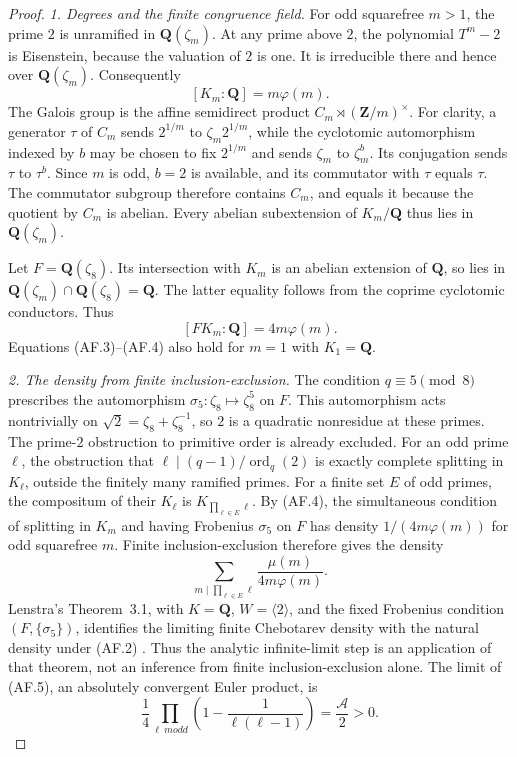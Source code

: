 \begin{proof}
\emph{1. Degrees and the finite congruence field.}
For odd squarefree $m>1$, the prime $2$ is unramified in
$\mathbf Q(\zeta_m)$. At any prime above $2$, the polynomial
$T^m-2$ is Eisenstein, because the valuation of $2$ is one.
It is irreducible there and hence over $\mathbf Q(\zeta_m)$.
Consequently
\[
                         [K_m:\mathbf Q]=m\varphi(m).
                                                               \tag{AF.3}
\]
The Galois group is the affine semidirect product
$C_m\rtimes(\mathbf Z/m)^\times$. For clarity, a generator
$\tau$ of $C_m$ sends $2^{1/m}$ to $\zeta_m2^{1/m}$, while the
cyclotomic automorphism indexed by $b$ may be chosen to fix
$2^{1/m}$ and sends $\zeta_m$ to $\zeta_m^b$.
Its conjugation sends $\tau$ to $\tau^b$. Since $m$ is odd,
$b=2$ is available, and its commutator with $\tau$ equals
$\tau$. The commutator subgroup therefore contains $C_m$,
and equals it because the quotient by $C_m$ is abelian.
Every abelian subextension of $K_m/\mathbf Q$ thus lies in
$\mathbf Q(\zeta_m)$.

Let $F=\mathbf Q(\zeta_8)$. Its intersection with $K_m$ is an
abelian extension of $\mathbf Q$, so lies in
$\mathbf Q(\zeta_m)\cap\mathbf Q(\zeta_8)=\mathbf Q$.
The latter equality follows from the coprime cyclotomic conductors.
Thus
\[
                       [FK_m:\mathbf Q]=4m\varphi(m).
                                                               \tag{AF.4}
\]
Equations (AF.3)--(AF.4) also hold for $m=1$ with $K_1=\mathbf Q$.

\emph{2. The density from finite inclusion-exclusion.}
The condition $q\equiv5\pmod8$ prescribes the automorphism
$\sigma_5:\zeta_8\mapsto\zeta_8^5$ on $F$. This automorphism
acts nontrivially on $\sqrt2=\zeta_8+\zeta_8^{-1}$, so $2$ is a
quadratic nonresidue at these primes. The prime-$2$ obstruction
to primitive order is already excluded.
For an odd prime $\ell$, the obstruction that
$\ell\mid(q-1)/\operatorname{ord}_q(2)$ is exactly complete
splitting in $K_\ell$, outside the finitely many ramified primes.
For a finite set $E$ of odd primes, the compositum of their
$K_\ell$ is $K_{\prod_{\ell\in E}\ell}$.
By (AF.4), the simultaneous condition of splitting in $K_m$ and
having Frobenius $\sigma_5$ on $F$ has density
$1/(4m\varphi(m))$ for odd squarefree $m$.
Finite inclusion-exclusion therefore gives the density
\[
 \sum_{m\mid\prod_{\ell\in E}\ell}
               \frac{\mu(m)}{4m\varphi(m)}.
                                                               \tag{AF.5}
\]
Lenstra's Theorem~3.1, with $K=\mathbf Q$, $W=\langle2\rangle$,
and the fixed Frobenius condition $(F,\{\sigma_5\})$, identifies
the limiting finite Chebotarev density with the natural density
under (AF.2) \cite[\S2 and Theorem~3.1]{Lenstra1977}.
Thus the analytic infinite-limit step is an application of that
theorem, not an inference from finite inclusion-exclusion alone.
The limit of (AF.5), an absolutely convergent Euler product, is
\[
 \frac14\prod_{\ell\ {
m odd}}
                \left(1-\frac1{\ell(\ell-1)}\right)
                         =\frac{\mathcal A}{2}>0.
\]


\end{proof}
